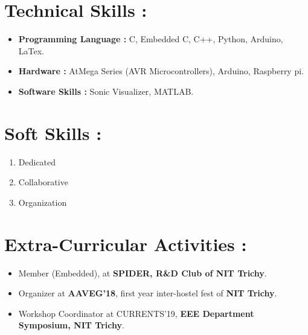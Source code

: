\documentclass[a4paper, 12 pt]{article}
\begin{document}
\section*{Technical Skills :}
\begin{itemize}
\item {\large {\bf Programming Language :}} C, Embedded C, C++, Python, Arduino, LaTex.
\item {\large {\bf Hardware :}} AtMega Series (AVR Microcontrollers), Arduino, Raspberry pi.
\item {\large {\bf Software Skills :}} Sonic Visualizer, MATLAB.
\end{itemize}
\section*{Soft Skills :}
\begin{enumerate}
\item Dedicated
\item Collaborative
\item Organization
\end{enumerate}
\section*{Extra-Curricular Activities :}
\begin{itemize}
\item Member (Embedded), at {\bf SPIDER, R\&D Club of NIT Trichy}.
\item Organizer at {\bf AAVEG’18}, first year inter-hostel fest of {\bf NIT Trichy}.
\item Workshop Coordinator at CURRENTS’19, {\bf EEE Department Symposium, NIT Trichy}.
\end{itemize}
\end{document}
